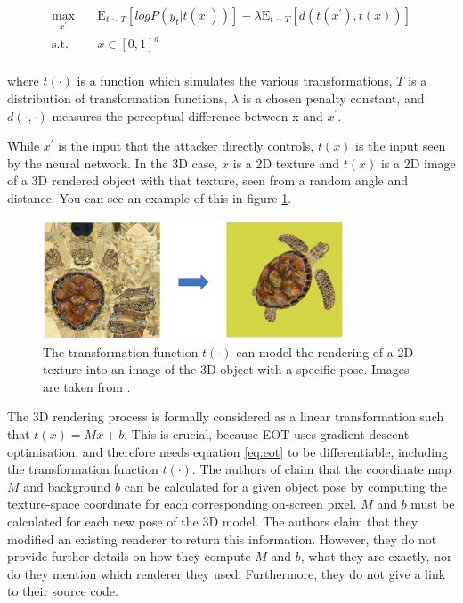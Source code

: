\begin{equation}
\label{eq:eot}
\begin{aligned}
\max_{x^\prime} \quad & \mathrm{E}_{t\sim T}[log P(y_{t} | t(x^\prime))] - \lambda \mathrm{E}_{t\sim T}[d(t(x^\prime), t(x))]\\
\textrm{s.t.} \quad & x \in [0, 1]^d   \\
\end{aligned}
\end{equation}

\noindent where $t(\cdot)$ is a function which simulates the various transformations, $T$ is a distribution of transformation functions, $\lambda$ is a chosen penalty constant, and $d(\cdot, \cdot)$ measures the perceptual difference between x and $x^\prime$.

While $x^\prime$ is the input that the attacker directly controls, $t(x)$ is the input seen by the neural network. In the 3D case, $x$ is a 2D texture and $t(x)$ is a 2D image of a 3D rendered object with that texture, seen from a random angle and distance. You can see an example of this in figure \ref{fig:rendering}. 

\begin{figure}[ht]
    \centering
    \includegraphics[width=0.8\textwidth]{graphics/rendering.JPG}
    \caption{The transformation function $t(\cdot)$ can model the rendering of a 2D texture into an image of the 3D object with a specific pose. Images are taken from \cite{athalye}.}
    \label{fig:rendering}
\end{figure}

The 3D rendering process is formally considered as a linear transformation such that $t(x) = Mx + b$. This is crucial, because EOT uses gradient descent optimisation, and therefore needs equation \ref{eq:eot} to be differentiable, including the transformation function $t(\cdot)$. The authors of \cite{athalye} claim that the coordinate map $M$ and background $b$ can be calculated for a given object pose by computing the texture-space coordinate for each corresponding on-screen pixel. $M$ and $b$ must be calculated for each new pose of the 3D model. The authors claim that they modified an existing renderer to return this information. However, they do not provide further details on how they compute $M$ and $b$, what they are exactly, nor do they mention which renderer they used. Furthermore, they do not give a link to their source code.

